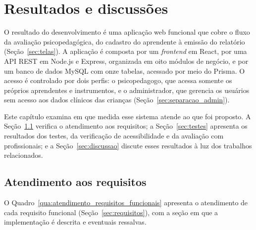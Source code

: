 \chapter[Resultados e discussões]{Resultados e discussões} \label{capitulo6}

O resultado do desenvolvimento é uma aplicação web funcional que cobre o fluxo da avaliação psicopedagógica, do cadastro do aprendente à emissão do relatório (Seção~\ref{sec:telas}). A aplicação é composta por um \textit{frontend} em React, por uma API REST em Node.js e Express, organizada em oito módulos de negócio, e por um banco de dados MySQL com onze tabelas, acessado por meio do Prisma. O acesso é controlado por dois perfis: o psicopedagogo, que acessa somente os próprios aprendentes e instrumentos, e o administrador, que gerencia os usuários sem acesso aos dados clínicos das crianças (Seção~\ref{sec:separacao_admin}).

Este capítulo examina em que medida esse sistema atende ao que foi proposto. A Seção~\ref{sec:atendimento_requisitos} verifica o atendimento aos requisitos; a Seção~\ref{sec:testes} apresenta os resultados dos testes, da verificação de acessibilidade e da avaliação com profissionais; e a Seção~\ref{sec:discussao} discute esses resultados à luz dos trabalhos relacionados.

\section{Atendimento aos requisitos}\label{sec:atendimento_requisitos}

O Quadro~\ref{qua:atendimento_requisitos_funcionais} apresenta o atendimento de cada requisito funcional (Seção~\ref{sec:requisitos}), com a seção em que a implementação é descrita e eventuais ressalvas.

